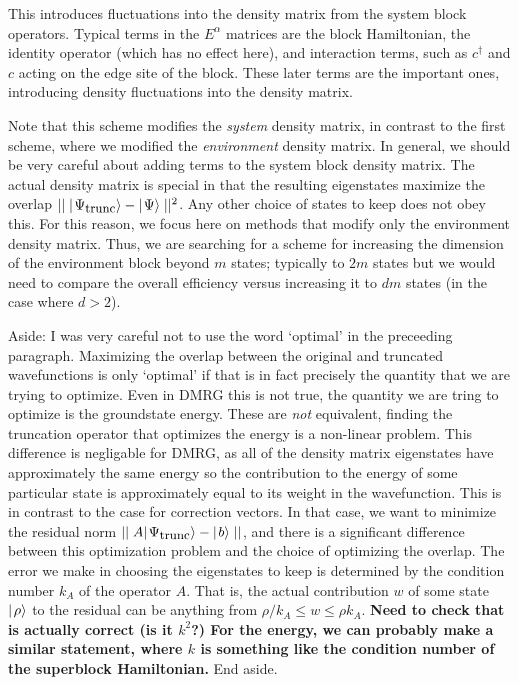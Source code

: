 \documentclass{article}[10pt]
\begin{document}
This introduces fluctuations into the density matrix from the system block operators. Typical
terms in the $E^\alpha$ matrices are the block Hamiltonian, the identity operator (which
has no effect here), and interaction terms, such as $c^\dagger$ and $c$ acting on the
edge site of the block. These later terms are the important ones, introducing density
fluctuations into the density matrix.

Note that this scheme modifies the \textit{system} density matrix, in contrast to the
first scheme, where we modified the \textit{environment} density matrix.
In general, we should be very careful about adding terms to the system block density matrix. 
The actual density matrix
is special in that the resulting eigenstates maximize the overlap 
$|| \; \hbox{$\mid \! {\Psi_{\mbox{\small trunc}}} \rangle$} - \hbox{$\mid \! {\Psi} \rangle$} \; ||^2$. Any other choice of
states to keep does not obey this. For this reason, we
focus here on methods that modify only the environment density matrix. Thus, we are searching
for a scheme for increasing the dimension of the environment block beyond $m$ states; typically
to $2m$ states but we would need to compare the overall efficiency versus increasing it to $dm$
states (in the case where $d > 2$).

Aside: I was very careful not to use the word `optimal' in the preceeding paragraph. Maximizing
the overlap between the original and truncated wavefunctions is only `optimal' if that
is in fact precisely the quantity that we are trying to optimize. Even in DMRG this is not true,
the quantity we are tring to optimize is the groundstate energy. These are \textit{not} equivalent,
finding the truncation operator that optimizes the energy is a non-linear problem. 
This difference is negligable for DMRG, as all of the density matrix eigenstates
have approximately the same energy so the contribution to the energy of some particular state
is approximately equal to its weight in the wavefunction. This is in contrast to the case
for correction vectors. In that case, we want to minimize the residual norm 
$|| \; A\hbox{$\mid \! {\Psi_{\mbox{\small trunc}}} \rangle$} - \hbox{$\mid \! {b} \rangle$} \; ||$, 
and there is a significant difference between this
optimization problem and the choice of optimizing the overlap. The error we make in
choosing the eigenstates to keep is determined by the condition number $k_A$ of the operator $A$. 
That is, the actual
contribution $w$ of some state $\hbox{$\mid \! {\rho} \rangle$}$ to the residual can be anything
from $\rho / k_A \leq w \leq \rho k_A$. 
\textbf{Need to check that is actually correct (is it $k^2$?)
For the energy, we can probably make a similar statement, where $k$ is something 
like the condition number of the superblock Hamiltonian.}
End aside.
\end{document}
